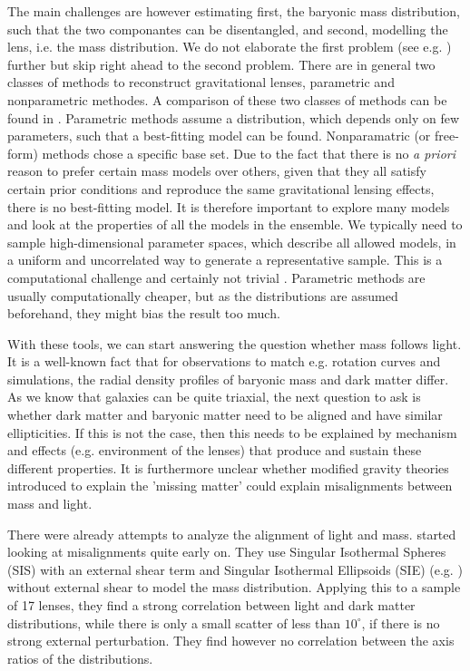 \documentclass[10pt]{article}
\begin{document}
The main challenges are however estimating first, the baryonic mass distribution, such that the two componantes can be disentangled, and second, modelling the lens, i.e. the mass distribution. We do not elaborate the first problem (see e.g. \cite{leier11phd}) further but skip right ahead to the second problem. There are in general two classes of methods to reconstruct gravitational lenses, parametric and nonparametric methodes. A comparison of these two classes of methods can be found in \cite{2008ApJ...681..814C}. Parametric methods assume a distribution, which depends only on few parameters, such that a best-fitting model can be found. Nonparamatric (or free-form) methods chose a specific base set. Due to the fact that there is no \textit{a priori} reason to prefer certain mass models over others, given that they all satisfy certain prior conditions and reproduce the same gravitational lensing effects, there is no best-fitting model. It is therefore important to explore many models and look at the properties of all the models in the ensemble. We typically need to sample high-dimensional parameter spaces, which describe all allowed models, in a uniform and uncorrelated way to generate a representative sample. This is a computational challenge and certainly not trivial \citep{2008ApJ...679...17C,2012MNRAS.425.3077L}. Parametric methods are usually computationally cheaper, but as the distributions are assumed beforehand, they might bias the result too much.

With these tools, we can start answering the question whether mass follows light. It is a well-known fact that for observations to match e.g. rotation curves and simulations, the radial density profiles of baryonic mass and dark matter differ. As we know that galaxies can be quite triaxial, the next question to ask is whether dark matter and baryonic matter need to be aligned and have similar ellipticities. If this is not the case, then this needs to be explained by mechanism and effects (e.g. environment of the lenses) that produce and sustain these different properties. It is furthermore unclear whether modified gravity theories introduced to explain the 'missing matter' could explain misalignments between mass and light.

There were already attempts to analyze the alignment of light and mass. \cite{1997ApJ...482..604K} started looking at misalignments quite early on. They use Singular Isothermal Spheres (SIS) with an external shear term and Singular Isothermal Ellipsoids (SIE) (e.g. \cite{1994A&A...284..285K}) without external shear to model the mass distribution. Applying this to a sample of 17 lenses, they find a strong correlation between light and dark matter distributions, while there is only a small scatter of less than $10^{\circ}$, if there is no strong external perturbation. They find however no correlation between the axis ratios of the distributions.
\end{document}
